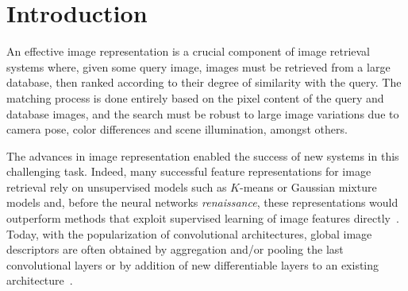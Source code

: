 \section{Introduction}



An effective image 
representation is a crucial component of image retrieval systems
where, given some query image,  images must be retrieved from a large 
database, then ranked according to their degree of similarity with the 
query.
The matching process is done entirely based on the pixel content of the query and database images, and the search must be robust to large image variations due to camera pose, color differences and scene illumination, amongst others.


The advances in image representation enabled the success of new systems in this challenging task. %
Indeed, many successful feature representations for image retrieval rely on unsupervised models such as $K$-means \cite{Delhumeau2013} or Gaussian mixture models \cite{Perronnin2010} and, before the neural networks \textit{renaissance}, these representations would outperform methods that exploit supervised learning of image features directly~\cite{Bilen2015,Rana}.
Today, with the popularization of convolutional architectures, global image descriptors are often obtained by aggregation and/or pooling the last convolutional layers \cite{babenko15,GoAlReLa16,KaMeOs16} or by addition of new differentiable layers to an existing architecture~\cite{Arandjelovic15}.

